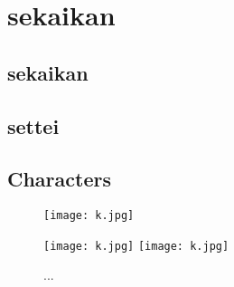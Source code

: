 %
%
%

\section{\projectname \space \Gls{sekaikan}}

\subsection{\Gls{sekaikan}}

\subsection{\Gls{settei}}

\subsection{Characters}

\begin{figure}[H]
\texttt{[image: k.jpg]}
\centering
\caption{...}
\texttt{[image: k.jpg]}
\texttt{[image: k.jpg]}
\centering
\caption{...}
\centering
\end{figure}


